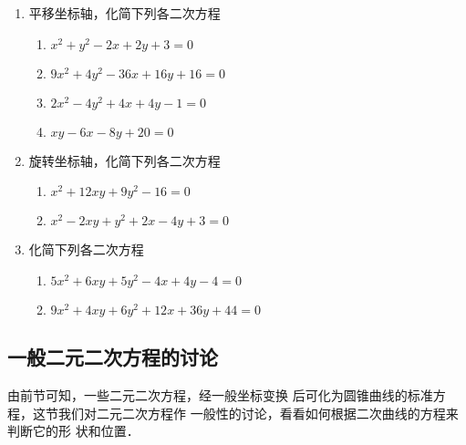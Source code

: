 \begin{ex}
\begin{enumerate}
    \item 平移坐标轴，化简下列各二次方程
\begin{enumerate}
\item $x^2+y^2-2x+2y+3=0$
\item $9x^2+4y^2-36x+16y+16=0$
\item $2x^2-4y^2+4x+4y-1=0$
\item $xy-6x-8y+20=0$
\end{enumerate}

    \item 旋转坐标轴，化简下列各二次方程
\begin{enumerate}
     \item $x^2+12xy+9y^2-16=0$
    \item $x^2-2xy+y^2+2x-4y+3=0$
\end{enumerate}    

    \item 化简下列各二次方程
\begin{enumerate}
    \item $5x^2+6xy+5y^2-4x+4y-4=0$
    \item $9x^2+4xy+6y^2+12x+36y+44=0$
\end{enumerate}
\end{enumerate}
\end{ex}

\subsection{一般二元二次方程的讨论}
由前节可知，一些二元二次方程，经一般坐标变换
后可化为圆锥曲线的标准方程，这节我们对二元二次方程作
一般性的讨论，看看如何根据二次曲线的方程来判断它的形
状和位置．

